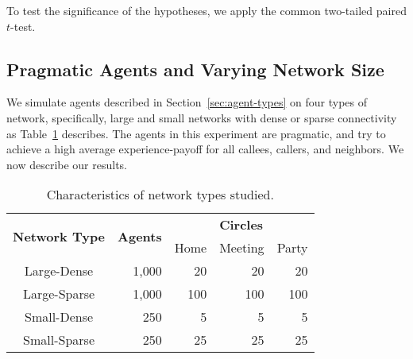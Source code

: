 \documentclass[11pt,          %
               phd,           %
               onehalfspacing %
               ]{ncsuthesis}
\newcommand{\fbf}{\textbf}
\begin{document}
To test the significance of the hypotheses, we apply the common two-tailed paired $t$-test. 

\subsection{Pragmatic Agents and Varying Network Size}
\label{sec:experiment1}

We simulate agents described in Section~\ref{sec:agent-types} on four
types of network, specifically, large and small networks with dense or
sparse connectivity as Table~\ref{tab:network-types} describes. The
agents in this experiment are pragmatic, and try to achieve a high average
experience-payoff for all callees, callers, and neighbors. We now
describe our results.

\begin{table}[!htb]
\centering
\caption{Characteristics of network types studied.}
\label{tab:network-types}
\begin{tabular}{crrrr}
\toprule
\multirow{2}{*}{\fbf{Network Type}} & \multirow{2}{*}{\fbf{Agents}} & \multicolumn{3}{c}{\fbf{Circles}}\\
\cmidrule{3-5}
&&Home&Meeting&Party\\
\midrule
Large-Dense&1,000&20&20&20\\
Large-Sparse&1,000&100&100&100\\
Small-Dense&250&5&5&5\\
Small-Sparse&250&25&25&25\\
\bottomrule
\end{tabular}
\end{table}
\end{document}
